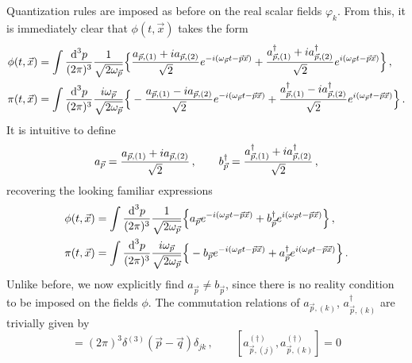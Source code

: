 Quantization rules are imposed as before on the real scalar fields $\varphi_k$. From this, it is immediately clear that $\phi(t,\vec{x})$ takes the form
\begin{subequations}    
    \begin{align}
        \phi(t,\vec{x})&=\int\frac{\text{d}^3p}{(2\pi)^3}\frac{1}{\sqrt{2\omega_{\vec{p}}}}\Big\{\frac{a_{\vec{p},(1)}+{i} a_{\vec{p},(2)}}{\sqrt{2}}e^{-{i}(\omega_{\vec{p}}t-\vec{p}\vec{x})}+\frac{a_{\vec{p},(1)}^\dagger+{i} a_{\vec{p},(2)}^\dagger}{\sqrt{2}}e^{{i}(\omega_{\vec{p}}t-\vec{p}\vec{x})}\Big\}\,,\\
        \pi(t,\vec{x})&=\int\frac{\text{d}^3p}{(2\pi)^3}\frac{{i}\omega_{\vec{p}}}{\sqrt{2\omega_{\vec{p}}}}\Big\{-\frac{a_{\vec{p},(1)}-{i} a_{\vec{p},(2)}}{\sqrt{2}}e^{-{i}(\omega_{\vec{p}}t-\vec{p}\vec{x})}+\frac{a_{\vec{p},(1)}^\dagger-{i} a_{\vec{p},(2)}^\dagger}{\sqrt{2}}e^{{i}(\omega_{\vec{p}}t-\vec{p}\vec{x})}\Big\}\,.
    \end{align}
\end{subequations}
It is intuitive to define
\begin{equation}
    a_{\vec{p}}=\frac{a_{\vec{p},(1)}+{i} a_{\vec{p},(2)}}{\sqrt{2}}\,,\qquad b_{\vec{p}}^\dagger=\frac{a_{\vec{p},(1)}^\dagger+{i} a_{\vec{p},(2)}^\dagger}{\sqrt{2}}\,,
\end{equation}
recovering the looking familiar expressions
\begin{subequations}    
    \begin{align}
        \phi(t,\vec{x})&=\int\frac{\text{d}^3p}{(2\pi)^3}\frac{1}{\sqrt{2\omega_{\vec{p}}}}\Big\{a_{\vec{p}}e^{-{i}(\omega_{\vec{p}}t-\vec{p}\vec{x})}+b_{\vec{p}}^\dagger e^{{i}(\omega_{\vec{p}}t-\vec{p}\vec{x})}\Big\}\,,\\
        \pi(t,\vec{x})&=\int\frac{\text{d}^3p}{(2\pi)^3}\frac{{i}\omega_{\vec{p}}}{\sqrt{2\omega_{\vec{p}}}}\Big\{-b_{\vec{p}}e^{-{i}(\omega_{\vec{p}}t-\vec{p}\vec{x})}+a_{\vec{p}}^\dagger e^{{i}(\omega_{\vec{p}}t-\vec{p}\vec{x})}\Big\}\,.
    \end{align}
\end{subequations}
Unlike before, we now explicitly find ${a_{\vec{p}}\neq b_{\vec{p}}}$, since there is no reality condition to be imposed on the fields $\phi$. The commutation relations of $a_{\vec{p},(k)}$, $a_{\vec{p},(k)}^\dagger$ are trivially given by
\begin{equation}
    [a_{\vec{p},(j)},a_{\vec{q},(k)}^\dagger]=(2\pi)^3\delta^{(3)}(\vec{p}-\vec{q})\delta_{jk}\,,\qquad[a_{\vec{p},(j)}^{(\dagger)},a_{\vec{p},(k)}^{(\dagger)}]=0
\end{equation}
